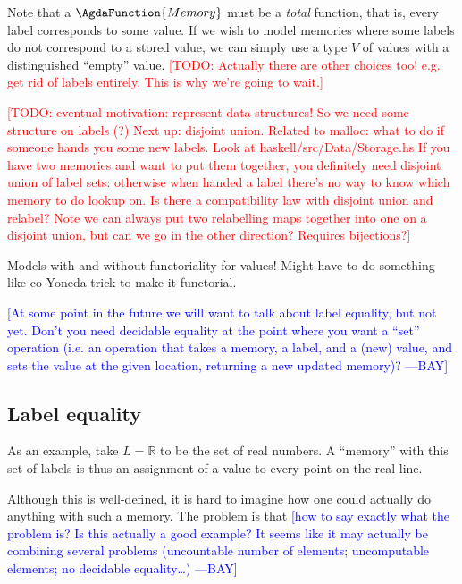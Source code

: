 \documentclass{jfp}
\newcommand{\authornote}[3]{\textcolor{#1}{[#3 ---#2]}}
\newcommand{\todo}[1]{\textcolor{red}{[TODO: #1]}}
\newcommand{\authornote}[3]{}
\newcommand{\todo}[1]{}
\newcommand{\bay}[1]{\authornote{blue}{BAY}{#1}}
\begin{document}
\begin{commentary}
Note that a $\AgdaFunction{Memory}$ must be a \emph{total} function,
that is, every label corresponds to some value.  If we wish to model
memories where some labels do not correspond to a stored value, we can
simply use a type $V$ of values with a distinguished ``empty'' value.
\todo{Actually there are other choices too!  e.g. get rid of labels
  entirely.  This is why we're going to wait.}
\end{commentary}

\todo{eventual motivation: represent data structures!  So we need some
  structure on labels (?)  Next up: disjoint union.  Related to
  malloc: what to do if someone hands you some new labels.  Look at
  haskell/src/Data/Storage.hs If you have two memories and want to put
  them together, you definitely need disjoint union of label sets:
  otherwise when handed a label there's no way to know which memory to
  do lookup on.  Is there a compatibility law with disjoint union and
  relabel?  Note we can always put two relabelling maps together into
  one on a disjoint union, but can we go in the other direction?
  Requires bijections?}

\begin{commentary}
  Models with and without functoriality for values!  Might have to do
  something like co-Yoneda trick to make it functorial.
\end{commentary}

\bay{At some point in the future we will want to talk about label
  equality, but not yet.  Don't you need decidable equality at the
  point where you want a ``set'' operation (i.e. an operation that
  takes a memory, a label, and a (new) value, and sets the value at
  the given location, returning a new updated memory)?}

\subsection{Label equality}
\label{sec:label-equality}

As an example, take $L = \mathbb{R}$ to be the set of real numbers.
A ``memory'' with this set of labels is thus an assignment of a value
to every point on the real line.

Although this is well-defined, it is hard to imagine how one could
actually do anything with such a memory.  The problem is that
\bay{how to say exactly what the problem is?  Is this actually a good
  example?  It seems like it may actually be combining several
  problems (uncountable number of elements; uncomputable elements; no
  decidable equality\dots)}
\end{document}
